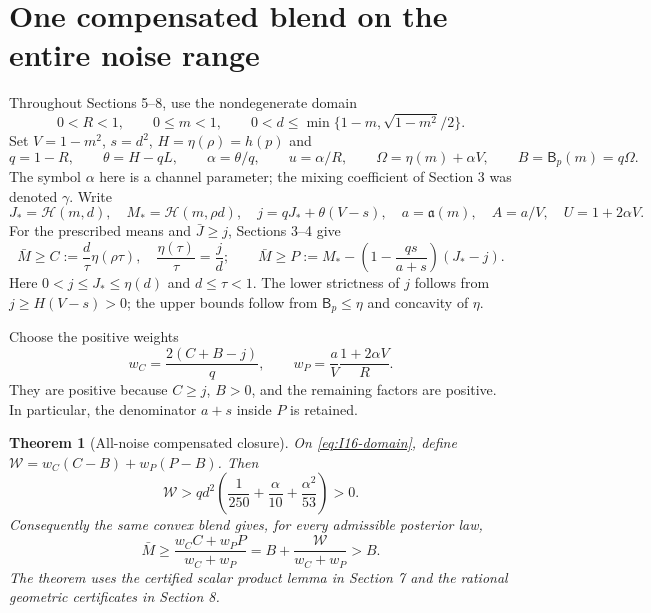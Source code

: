 \documentclass[11pt]{article}
\newtheorem{theorem}{Theorem}[section]
\theoremstyle{remark}\newtheorem{remark}[theorem]{Remark}
\newcommand{\Bprof}{\mathsf B_p}\newcommand{\Pprof}{\Phi_p}
\newcommand{\privA}{\mathfrak a}\newcommand{\Afun}{\mathscr A}
\numberwithin{equation}{section}
\begin{document}
\section{One compensated blend on the entire noise range}\label{sec:blend}
Throughout Sections 5--8, use the nondegenerate domain
\begin{equation}\label{eq:I16-domain}
 0<R<1,\qquad 0\le m<1,\qquad
 0<d\le\min\{1-m,\sqrt{1-m^2}/2\}.
\end{equation}
Set $V=1-m^2$, $s=d^2$, $H=\eta(\rho)=h(p)$ and
\[
 q=1-R,\qquad \theta=H-qL,\qquad
 \alpha=\theta/q,\qquad u=\alpha/R,\qquad
 \Omega=\eta(m)+\alpha V,\qquad B=\Bprof(m)=q\Omega.
\]
The symbol $\alpha$ here is a channel parameter; the mixing coefficient of
Section 3 was denoted $\gamma$. Write
\begin{equation}\label{eq:I16-budget}
 J_*=\mathcal H(m,d),\quad M_*=\mathcal H(m,\rho d),\quad
 j=qJ_*+\theta(V-s),\quad a=\privA(m),\quad A=a/V,\quad U=1+2\alpha V.
\end{equation}
For the prescribed means and $\bar J\ge j$, Sections 3--4 give
\begin{equation}\label{eq:I16-two-bounds}
 \bar M\ge C:=\frac d\tau\eta(\rho\tau),\quad
 \frac{\eta(\tau)}\tau=\frac jd;\qquad
 \bar M\ge P:=M_*-\left(1-\frac{qs}{a+s}\right)(J_*-j).
\end{equation}
Here $0<j\le J_*\le\eta(d)$ and $d\le\tau<1$. The lower strictness of
$j$ follows from $j\ge H(V-s)>0$; the upper bounds follow from
$\Bprof\le\eta$ and concavity of $\eta$.

Choose the positive weights
\begin{equation}\label{eq:I16-weights}
 \boxed{w_C=\frac{2(C+B-j)}q,\qquad
 w_P=\frac aV\frac{1+2\alpha V}{R}.}
\end{equation}
They are positive because $C\ge j$, $B>0$, and the remaining factors are
positive. In particular, the denominator $a+s$ inside $P$ is retained.

\begin{theorem}[All-noise compensated closure]\label{thm:I16-blend}
On \eqref{eq:I16-domain}, define
$\mathcal W=w_C(C-B)+w_P(P-B)$. Then
\begin{equation}\label{eq:I16-margin}
 \boxed{\mathcal W>
 qd^2\left(\frac1{250}+\frac\alpha{10}+\frac{\alpha^2}{53}\right)>0.}
\end{equation}
Consequently the same convex blend gives, for every admissible posterior law,
\begin{equation}\label{eq:I16-assembly}
 \bar M\ge\frac{w_CC+w_PP}{w_C+w_P}
 =B+\frac{\mathcal W}{w_C+w_P}>B.
\end{equation}
The theorem uses the certified scalar product lemma in Section 7 and the
rational geometric certificates in Section 8.
\end{theorem}
\end{document}
